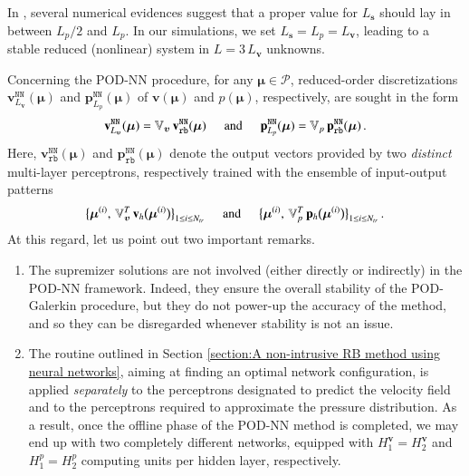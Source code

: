 \documentclass{elsarticle}
\numberwithin{equation}{section}
\theoremstyle{theorem}
\theoremstyle{definition}
\theoremstyle{remark}
\theoremstyle{proposition}
\numberwithin{figure}{section}
\newcommand{\bg}[1]{\boldsymbol{#1}}
\begin{document}
		In \cite{Bal14}, several numerical evidences suggest that a proper value for $L_{\bg{s}}$ should lay in between $L_p / 2$ and $L_p$. In our simulations, we set $L_{\bg{s}} = L_p = L_{\bg{v}}$, leading to a stable reduced (nonlinear) system in $L = 3 \, L_{\bg{v}}$ unknowns.
		
		Concerning the POD-NN procedure, for any $\bg{\mu} \in \mathcal{P}$, reduced-order discretizations $\mathbf{v}_{L_{\bg{v}}}^{\texttt{NN}}(\bg{\mu})$ and $\mathbf{p}_{L_p}^{\texttt{NN}}(\bg{\mu})$ of $\bg{v}(\bg{\mu})$ and $p(\bg{\mu})$, respectively, are sought in the form
		\begin{equation*}
			\mathbf{v}_{L_{\bg{v}}}^{\texttt{NN}}(\bg{\mu}) = \mathbb{V}_{\bg{v}} \, \mathbf{v}_{\texttt{rb}}^{\texttt{NN}}(\bg{\mu}) \hspace*{0.5cm} \text{and} \hspace*{0.5cm} \mathbf{p}_{L_p}^{\texttt{NN}}(\bg{\mu}) = \mathbb{V}_{p} \, \mathbf{p}_{\texttt{rb}}^{\texttt{NN}}(\bg{\mu}) \, .
		\end{equation*}
		Here, $\mathbf{v}_{\texttt{rb}}^{\texttt{NN}}(\bg{\mu})$ and $\mathbf{p}_{\texttt{rb}}^{\texttt{NN}}(\bg{\mu})$ denote the output vectors provided by two \emph{distinct} multi-layer perceptrons, respectively trained with the ensemble of input-output patterns
		\begin{equation*}
			\big\lbrace \bg{\mu}^{(i)}, \, \mathbb{V}_{\bg{v}}^T \, \mathbf{v}_h \big( \bg{\mu}^{(i)} \big) \big\rbrace_{1 \leq i \leq N_{tr}} \hspace*{0.5cm} \text{and} \hspace*{0.5cm} \big\lbrace \bg{\mu}^{(i)}, \, \mathbb{V}_{p}^T \, \mathbf{p}_h \big( \bg{\mu}^{(i)} \big) \big\rbrace_{1 \leq i \leq N_{tr}} \, .
		\end{equation*}
		At this regard, let us point out two important remarks.
		\begin{enumerate}[label=(\roman*)]
			\item The supremizer solutions are not involved (either directly or indirectly) in the POD-NN framework. Indeed, they ensure the overall stability of the POD-Galerkin procedure, but they do not power-up the accuracy of the method, and so they can be disregarded whenever stability is not an issue.
			\item The routine outlined in Section \ref{section:A non-intrusive RB method using neural networks}, aiming at finding an optimal network configuration, is applied \emph{separately} to the perceptrons designated to predict the velocity field and to the perceptrons required to approximate the pressure distribution. As a result, once the offline phase of the POD-NN method is completed, we may end up with two completely different networks, equipped with $H_1^{\bg{v}} = H_2^{\bg{v}}$ and $H_1^p = H_2^p$ computing units per hidden layer, respectively.  
		\end{enumerate}
\end{document}
